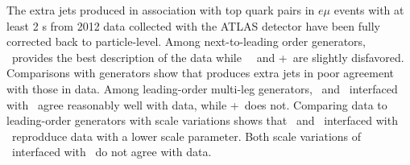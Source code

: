 The extra jets produced in association with top quark pairs in $e\mu$ events with at least 2 \bjet s from 2012 data collected with the ATLAS detector have been fully corrected back to particle-level. Among next-to-leading order generators, 
\hdamp\ provides the best description of the data while
\powpy\, \peight\ and \pow+\hw\ are slightly disfavored. Comparisons with generators show that \mcnlohw produces extra jets in poor agreement with those in data. Among leading-order multi-leg generators,  \madgraph\ and \alpg\ interfaced with \py\ agree reasonably well with data,  while \alpg+\hw\ does not. Comparing data to leading-order generators with scale variations shows  that \madgraph\ and \alpg\ interfaced with \py\ reprodduce data with a lower scale parameter. Both scale variations of \acermc\ interfaced with \py\ do not agree with data.